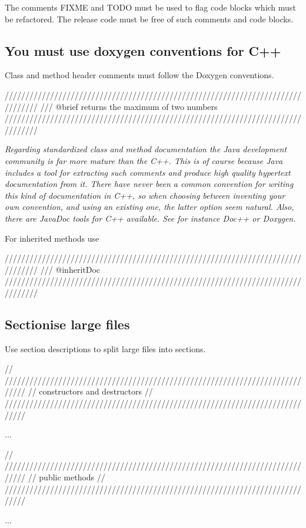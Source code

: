 \documentclass[a4paper,11pt,oneside]{scrbook}
\newcommand{\guideline}[1]{{\subsection{#1}}}
\newcommand{\motivation}[1]{{\normalfont \itshape #1}}
\newcommand{\trcode}[1]{{\normalfont \ttfamily #1}}
\begin{document}
The comments \trcode{FIXME} and \trcode{TODO} must be used to flag code blocks
which must be refactored. The release code must be free of such comments and
code blocks.

\guideline{You must use doxygen conventions for C++}

Class and method header comments must follow the Doxygen conventions.
 
\begin{code}
  ////////////////////////////////////////////////////////////////////////////////
  /// @brief returns the maximum of two numbers
  ////////////////////////////////////////////////////////////////////////////////
\end{code}

\motivation{
  Regarding standardized class and method documentation the Java development
  community is far more mature than the C++. This is of course because Java
  includes a tool for extracting such comments and produce high quality
  hypertext documentation from it.  There have never been a common convention
  for writing this kind of documentation in C++, so when choosing between
  inventing your own convention, and using an existing one, the latter option
  seem natural. Also, there are JavaDoc tools for C++ available. See for
  instance Doc++ or Doxygen.
}

For inherited methods use

\begin{code}
  ////////////////////////////////////////////////////////////////////////////////
  /// {@inheritDoc}
  ////////////////////////////////////////////////////////////////////////////////
\end{code}

\guideline{Sectionise large files}

Use section descriptions to split large files into sections.

\begin{code}
  // /////////////////////////////////////////////////////////////////////////////
  // constructors and destructors
  // /////////////////////////////////////////////////////////////////////////////

  ...

  // /////////////////////////////////////////////////////////////////////////////
  // public methods
  // /////////////////////////////////////////////////////////////////////////////

  ...
\end{code}
 
\end{document}

